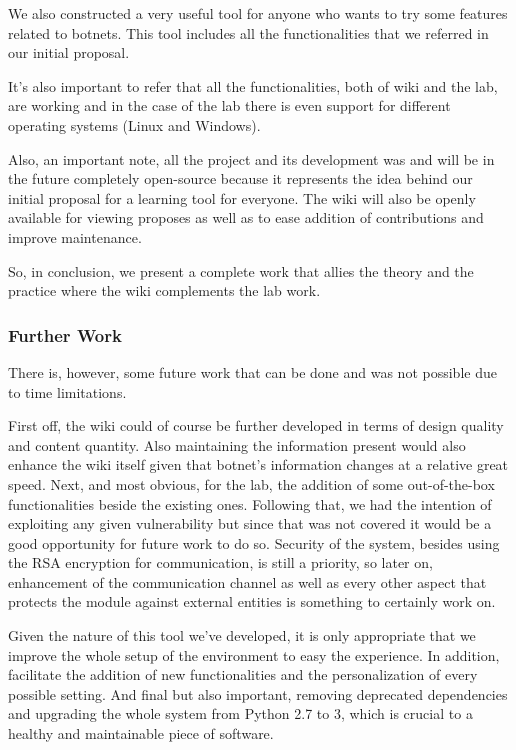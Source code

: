 \documentclass[]{article}
\begin{document}
We also constructed a very useful tool for anyone who wants to try some features related to botnets. This tool includes all the functionalities that we referred in our initial proposal.

It's also important to refer that all the functionalities, both of wiki and the lab, are working and in the case of the lab there is even support for different operating systems (Linux and Windows).

Also, an important note, all the project and its development was and will be in the future completely open-source because it represents the idea behind our initial proposal for a learning tool for everyone. The wiki will also be openly available for viewing proposes as well as to ease addition of contributions and improve maintenance.

So, in conclusion, we present a complete work that allies the theory and the practice where the wiki complements the lab work.


\subsubsection{Further Work}

There is, however, some future work that can be done and was not possible due to time limitations.

First off, the wiki could of course be further developed in terms of design quality and content quantity. Also maintaining the information present would also enhance the wiki itself given that botnet’s information changes at a relative great speed.
Next, and most obvious, for the lab, the addition of some out-of-the-box functionalities beside the existing ones. Following that, we had the intention of exploiting any given vulnerability but since that was not covered it would be a good opportunity for future work to do so.
Security of the system, besides using the RSA encryption for communication, is still a priority, so later on, enhancement of the communication channel as well as every other aspect that protects the module against external entities is something to certainly work on.

Given the nature of this tool we’ve developed, it is only appropriate that we improve the whole setup of the environment to easy the experience. In addition, facilitate the addition of new functionalities and the personalization of every possible setting. And final but also important, removing deprecated dependencies and upgrading the whole system from Python 2.7 to 3, which is crucial to a healthy and maintainable piece of software.

\newpage


 
 
\end{document}
